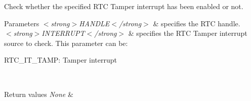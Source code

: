 Check whether the specified R\+TC Tamper interrupt has been enabled or not. 


\begin{DoxyParams}{Parameters}
{\em $<$strong$>$\+H\+A\+N\+D\+L\+E$<$/strong$>$} & specifies the R\+TC handle. \\
\hline
{\em $<$strong$>$\+I\+N\+T\+E\+R\+R\+U\+P\+T$<$/strong$>$} & specifies the R\+TC Tamper interrupt source to check. This parameter can be\+: \begin{DoxyItemize}
\item R\+T\+C\+\_\+\+I\+T\+\_\+\+T\+A\+MP\+: Tamper interrupt \end{DoxyItemize}
\\
\hline
\end{DoxyParams}

\begin{DoxyRetVals}{Return values}
{\em None} & \\
\hline
\end{DoxyRetVals}
